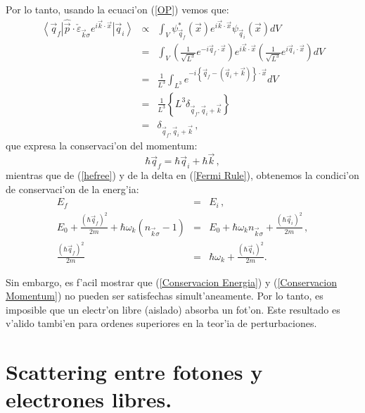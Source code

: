Por lo tanto, usando la ecuaci'on (\ref{OP}) vemos que:%
\begin{eqnarray}
\left\langle \vec{q}_f\right| \hat{\vec{p}}\cdot
\check{\varepsilon}_{\vec{k}\sigma}e^{i\vec{k}\cdot\vec{x}}\left| \vec
{q}_i\right\rangle  & \propto&\int_{V}\psi_{\vec{q}_f}^{\ast}\left(
\vec{x}\right) e^{i\vec{k}\cdot\vec{x}}\psi_{\vec{q}_i}\left( \vec
{x}\right) dV\\
& = &\int_{V}\left( \frac{1}{\sqrt{L^3}}e^{-i\vec{q}_f\cdot\vec{x}%
}\right) e^{i\vec{k}\cdot\vec{x}}\left( \frac{1}{\sqrt{L^3}}e^{i\vec
{q}_i\cdot\vec{x}}\right) dV\\
& = &\frac{1}{L^3}\int_{L^3}e^{-i\left\{ \vec{q}_f-\left( \vec{q}%
_i+\vec{k}\right) \right\} \cdot\vec{x}}dV\\
& = &\frac{1}{L^3}\left\{ L^3\delta_{\vec{q}_f,\vec{q}_i+\vec{k}%
}\right\} \\
& = &\delta_{\vec{q}_f,\vec{q}_i+\vec{k}} \, ,
\end{eqnarray}
que expresa la conservaci'on del momentum:
\begin{equation}
\hbar\vec{q}_f=\hbar\vec{q}_i+\hbar\vec{k} \, ,\label{Conservacion Momentum}
\end{equation}
mientras que de (\ref{hefree}) y de la delta en (\ref{Fermi Rule}), obtenemos la
condici'on de conservaci'on de la energ'ia:
\begin{eqnarray}
E_f & = &E_i\, ,\\
E_0+\frac{\left( \hbar\vec{q}_f\right)^2}{2m}+\hbar\omega_k\left(
n_{\vec{k}\sigma}-1\right) & = &E_0+\hbar\omega_kn_{\vec{k}\sigma}%
+\frac{\left( \hbar\vec{q}_i\right)^2}{2m} \, ,\\
\frac{\left( \hbar\vec{q}_f\right)^2}{2m} & = &\hbar\omega_k%
+\frac{\left( \hbar\vec{q}_i\right)^2}{2m}.\label{Conservacion Energia}%
\end{eqnarray}

Sin embargo, es f'acil mostrar que (\ref{Conservacion Energia}) y
(\ref{Conservacion Momentum}) no pueden ser satisfechas simult'aneamente. Por lo
tanto, es imposible que un electr'on libre (aislado) absorba un fot'on. Este
resultado es v'alido tambi'en para ordenes superiores en la teor'ia de
perturbaciones.


\section{Scattering entre fotones y electrones libres.}


